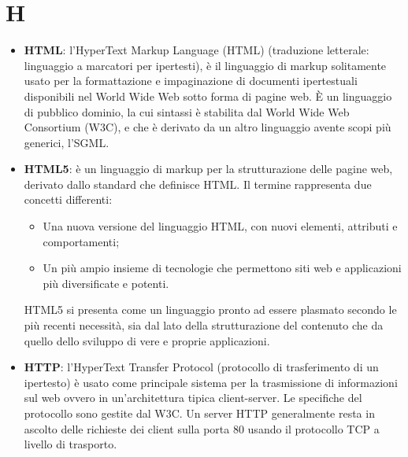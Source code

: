 \section{H}
\begin{itemize} 
	\item
	\textbf{HTML}: l'HyperText Markup Language (HTML) (traduzione letterale: linguaggio a marcatori per ipertesti), è il linguaggio di markup solitamente usato per la formattazione e impaginazione di documenti ipertestuali disponibili nel World Wide Web sotto forma di pagine web.
	È un linguaggio di pubblico dominio, la cui sintassi è stabilita dal World Wide Web Consortium (W3C), e che è derivato da un altro linguaggio avente scopi più generici, l'SGML. 
	\item
	\textbf{HTML5}: è un linguaggio di markup per la strutturazione delle pagine web, derivato dallo standard che definisce HTML.
	Il termine rappresenta due concetti differenti:
	\begin{itemize}
		\item
		Una nuova versione del linguaggio HTML, con nuovi elementi, attributi e comportamenti;
		\item
		Un più ampio insieme di tecnologie che permettono siti web e applicazioni più diversificate e potenti.
	\end{itemize}
	HTML5 si presenta come un linguaggio pronto ad essere plasmato secondo le più recenti necessità, sia dal lato della strutturazione del contenuto che da quello dello sviluppo di vere e proprie applicazioni.
	\item
	\textbf{HTTP}: l'HyperText Transfer Protocol (protocollo di trasferimento di un ipertesto) è usato come principale sistema per la trasmissione di informazioni sul web ovvero in un'architettura tipica client-server. Le specifiche del protocollo sono gestite dal W3C. Un server HTTP generalmente resta in ascolto delle richieste dei client sulla porta 80 usando il protocollo TCP a livello di trasporto.
\end{itemize}
